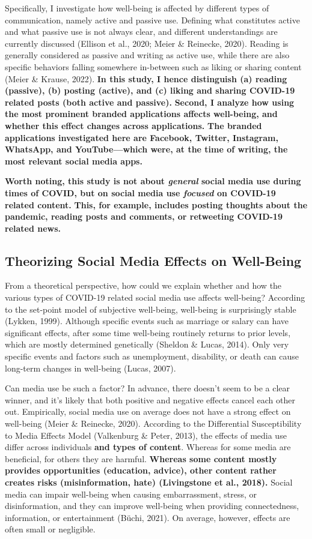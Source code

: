 \documentclass[
  man,mask]{apa7}
\begin{document}
Specifically, I investigate how well-being is affected by different types of communication, namely active and passive use.
Defining what constitutes active and what passive use is not always clear, and different understandings are currently discussed (Ellison et al., 2020; Meier \& Reinecke, 2020).
Reading is generally considered as passive and writing as active use, while there are also specific behaviors falling somewhere in-between such as liking or sharing content (Meier \& Krause, 2022).
\textbf{In this study, I hence distinguish (a) reading (passive), (b) posting (active), and (c) liking and sharing COVID-19 related posts (both active and passive).}
\textbf{Second, I analyze how using the most prominent branded applications affects well-being, and whether this effect changes across applications.}
\textbf{The branded applications investigated here are Facebook, Twitter, Instagram, WhatsApp, and YouTube---which were, at the time of writing, the most relevant social media apps.}

\textbf{Worth noting, this study is not about \emph{general} social media use during times of COVID, but on social media use \emph{focused} on COVID-19 related content.}
\textbf{This, for example, includes posting thoughts about the pandemic, reading posts and comments, or retweeting COVID-19 related news.}

\hypertarget{theorizing-social-media-effects-on-well-being}{%
\subsection{Theorizing Social Media Effects on Well-Being}\label{theorizing-social-media-effects-on-well-being}}

From a theoretical perspective, how could we explain whether and how the various types of COVID-19 related social media use affects well-being?
According to the set-point model of subjective well-being, well-being is surprisingly stable (Lykken, 1999).
Although specific events such as marriage or salary can have significant effects, after some time well-being routinely returns to prior levels, which are mostly determined genetically (Sheldon \& Lucas, 2014).
Only very specific events and factors such as unemployment, disability, or death can cause long-term changes in well-being (Lucas, 2007).

Can media use be such a factor?
In advance, there doesn't seem to be a clear winner, and it's likely that both positive and negative effects cancel each other out.
Empirically, social media use on average does not have a strong effect on well-being (Meier \& Reinecke, 2020).
According to the Differential Susceptibility to Media Effects Model (Valkenburg \& Peter, 2013), the effects of media use differ across individuals \textbf{and types of content}.
Whereas for some media are beneficial, for others they are harmful.
\textbf{Whereas some content mostly provides opportunities (education, advice), other content rather creates risks (misinformation, hate) (Livingstone et al., 2018).}
Social media can impair well-being when causing embarrassment, stress, or disinformation, and they can improve well-being when providing connectedness, information, or entertainment (Büchi, 2021).
On average, however, effects are often small or negligible.
\end{document}
